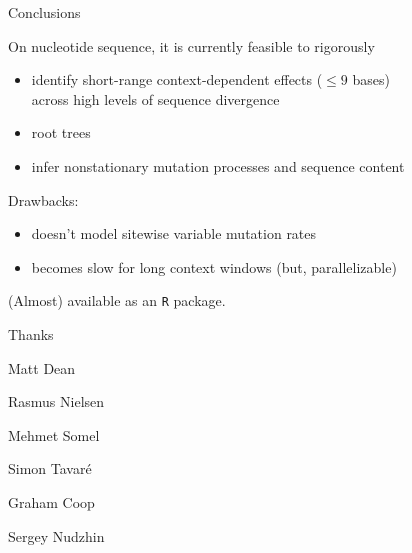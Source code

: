 \documentclass[smaller]{beamer}
\begin{document}
\begin{frame}{Conclusions}

  On nucleotide sequence, it is currently feasible to rigorously
  \begin{itemize}

    \item identify short-range context-dependent effects ($\le 9$ bases) \\
      across high levels of sequence divergence \\

    \item root trees 
      
    \item infer nonstationary mutation processes and sequence content

  \end{itemize}
  
  \vspace{2em}

  Drawbacks:
  \begin{itemize}

    \item doesn't model sitewise variable mutation rates 

    \item becomes slow for long context windows (but, parallelizable)

  \end{itemize}
  
  \vspace{2em}

  (Almost) available as an {\texttt R} package.

\end{frame}

\begin{frame}{Thanks}

  Matt Dean
  
  Rasmus Nielsen

  Mehmet Somel

  Simon Tavar\'e

  Graham Coop

  Sergey Nudzhin

\end{frame}
\end{document}
